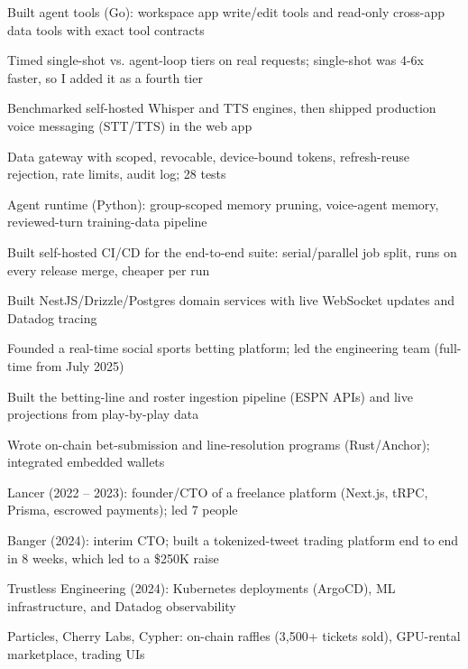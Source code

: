 \documentclass[print]{jack-resume}
\begin{document}
\begin{tightemize}
    \item Built agent tools (Go): workspace app write/edit tools and read-only cross-app data tools with exact tool contracts
    \item Timed single-shot vs. agent-loop tiers on real requests; single-shot was 4-6x faster, so I added it as a fourth tier
    \item Benchmarked self-hosted Whisper and TTS engines, then shipped production voice messaging (STT/TTS) in the web app
    \item Data gateway with scoped, revocable, device-bound tokens, refresh-reuse rejection, rate limits, audit log; 28 tests
    \item Agent runtime (Python): group-scoped memory pruning, voice-agent memory, reviewed-turn training-data pipeline
    \item Built self-hosted CI/CD for the end-to-end suite: serial/parallel job split, runs on every release merge, cheaper per run
\end{tightemize}
\sectionsep

\begin{tightemize}
    \item Built NestJS/Drizzle/Postgres domain services with live WebSocket updates and Datadog tracing
    \item Founded a real-time social sports betting platform; led the engineering team (full-time from July 2025)
    \item Built the betting-line and roster ingestion pipeline (ESPN APIs) and live projections from play-by-play data
    \item Wrote on-chain bet-submission and line-resolution programs (Rust/Anchor); integrated embedded wallets
\end{tightemize}
\sectionsep

\begin{tightemize}
    \item Lancer (2022 – 2023): founder/CTO of a freelance platform (Next.js, tRPC, Prisma, escrowed payments); led 7 people
    \item Banger (2024): interim CTO; built a tokenized-tweet trading platform end to end in 8 weeks, which led to a \$250K raise
    \item Trustless Engineering (2024): Kubernetes deployments (ArgoCD), ML infrastructure, and Datadog observability
    \item Particles, Cherry Labs, Cypher: on-chain raffles (3,500+ tickets sold), GPU-rental marketplace, trading UIs
\end{tightemize}
\sectionsep
\end{document}
